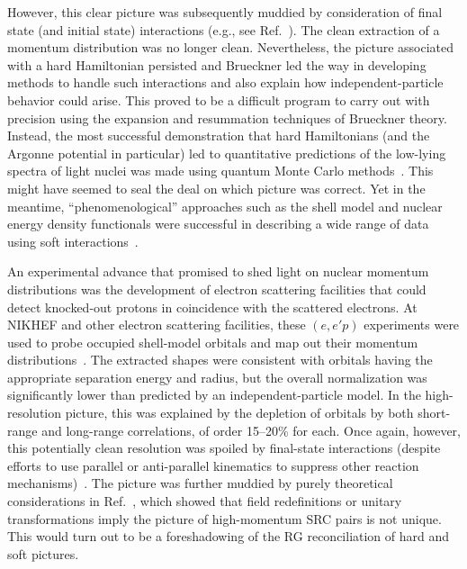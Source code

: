 \documentclass[10pt,aps,prc,floatfix,twocolumn,nofootinbib]{revtex4-1}
\begin{document}
However, this clear picture was subsequently muddied by consideration of final state (and initial state) interactions (e.g., see Ref.~\cite{PhysRev.114.786}). 
The clean extraction of a momentum distribution was no longer clean.
Nevertheless, the picture associated with a hard Hamiltonian persisted and Brueckner led the way in developing methods to handle such interactions and also explain how independent-particle behavior could arise.
This proved to be a difficult program to carry out with precision using the expansion and resummation techniques of Brueckner theory.
Instead, the most successful demonstration that hard Hamiltonians (and the Argonne potential in particular) led to quantitative predictions of the low-lying spectra of light nuclei was made using quantum Monte Carlo methods~\cite{Pieper:2001mp,Carlson:2014vla}.
This might have seemed to seal the deal on which picture was correct.
Yet in the meantime, ``phenomenological'' approaches such as the shell model and nuclear energy density functionals  were successful in describing a wide range of data using soft interactions~\cite{preston1975structure,Ring:2005}.

An experimental advance that promised to shed light on nuclear momentum distributions was the development of electron scattering facilities that could detect knocked-out protons in coincidence with the scattered electrons.
At NIKHEF and other electron scattering facilities, these $(e,e'p)$ experiments were used to probe occupied shell-model orbitals and map out their momentum distributions~\cite{Dieperink:1990uk,Kelly:1996hd}.
The extracted shapes were consistent with orbitals having the appropriate separation energy and radius, but the overall normalization was significantly lower than predicted by an independent-particle model.
In the high-resolution picture, this was explained by the depletion of orbitals by both short-range and long-range correlations, of order 15--20\% for each.
Once again, however, this potentially clean resolution was spoiled by final-state interactions (despite efforts to use parallel or anti-parallel kinematics to suppress other reaction mechanisms)~\cite{Bianconi:1995mz}.
The picture was further muddied by purely theoretical considerations in Ref.~\cite{Furnstahl:2001xq}, which showed that field redefinitions or unitary transformations imply the picture of high-momentum SRC pairs is not unique.
This would turn out to be a foreshadowing of the RG reconciliation of hard and soft pictures.
\end{document}
